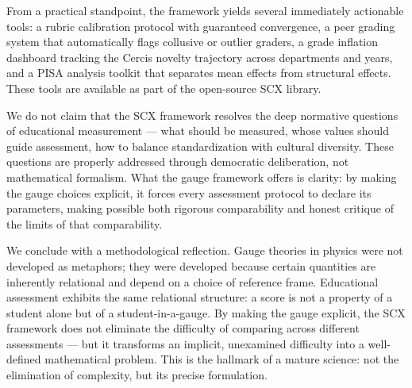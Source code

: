 \documentclass[12pt,a4paper]{article}
\theoremstyle{remark}
\begin{document}
From a practical standpoint, the framework yields several immediately actionable tools: a rubric calibration protocol with guaranteed convergence, a peer grading system that automatically flags collusive or outlier graders, a grade inflation dashboard tracking the Cercis novelty trajectory across departments and years, and a PISA analysis toolkit that separates mean effects from structural effects. These tools are available as part of the open-source SCX library.

We do not claim that the SCX framework resolves the deep normative questions of educational measurement --- what should be measured, whose values should guide assessment, how to balance standardization with cultural diversity. These questions are properly addressed through democratic deliberation, not mathematical formalism. What the gauge framework offers is clarity: by making the gauge choices explicit, it forces every assessment protocol to declare its parameters, making possible both rigorous comparability and honest critique of the limits of that comparability.

We conclude with a methodological reflection. Gauge theories in physics were not developed as metaphors; they were developed because certain quantities are inherently relational and depend on a choice of reference frame. Educational assessment exhibits the same relational structure: a score is not a property of a student alone but of a student-in-a-gauge. By making the gauge explicit, the SCX framework does not eliminate the difficulty of comparing across different assessments --- but it transforms an implicit, unexamined difficulty into a well-defined mathematical problem. This is the hallmark of a mature science: not the elimination of complexity, but its precise formulation.
\end{document}
